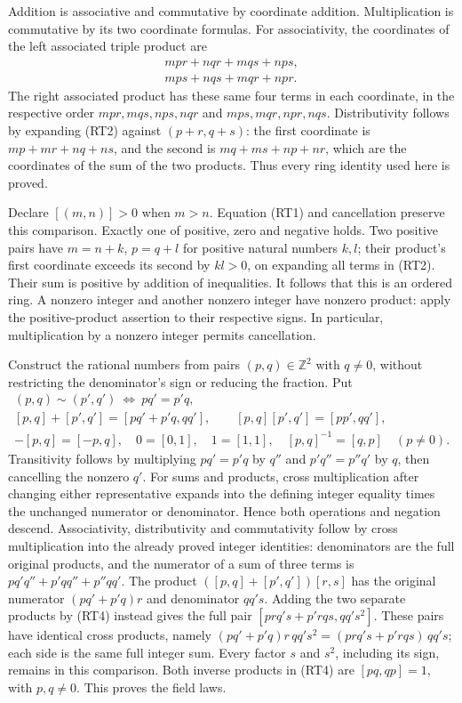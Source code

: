 \documentclass[
  11pt,
]{article}
\begin{document}
Addition is associative and commutative by coordinate addition.
Multiplication is commutative by its two coordinate formulas. For
associativity, the coordinates of the left associated triple product are
\[
\begin{gathered}
mpr+nqr+mqs+nps,\\
mps+nqs+mqr+npr.
\end{gathered}
\tag{RT3}
\] The right associated product has these same four terms in each
coordinate, in the respective order \(mpr,mqs,nps,nqr\) and
\(mps,mqr,npr,nqs\). Distributivity follows by expanding (RT2) against
\((p+r,q+s)\): the first coordinate is \(mp+mr+nq+ns\), and the second
is \(mq+ms+np+nr\), which are the coordinates of the sum of the two
products. Thus every ring identity used here is proved.

Declare \([(m,n)]>0\) when \(m>n\). Equation (RT1) and cancellation
preserve this comparison. Exactly one of positive, zero and negative
holds. Two positive pairs have \(m=n+k\), \(p=q+l\) for positive natural
numbers \(k,l\); their product's first coordinate exceeds its second by
\(kl>0\), on expanding all terms in (RT2). Their sum is positive by
addition of inequalities. It follows that this is an ordered ring. A
nonzero integer and another nonzero integer have nonzero product: apply
the positive-product assertion to their respective signs. In particular,
multiplication by a nonzero integer permits cancellation.

Construct the rational numbers from pairs \((p,q)\in\mathbb Z^2\) with
\(q\ne0\), without restricting the denominator's sign or reducing the
fraction. Put \[
\begin{gathered}
(p,q)\sim(p',q')\ \Longleftrightarrow\ pq'=p'q,\\
[p,q]+[p',q']=[pq'+p'q,qq'],\qquad
[p,q][p',q']=[pp',qq'],\\
-[p,q]=[-p,q],\quad 0=[0,1],\quad 1=[1,1],\quad
[p,q]^{-1}=[q,p]\quad(p\ne0).
\end{gathered}
\tag{RT4}
\] Transitivity follows by multiplying \(pq'=p'q\) by \(q''\) and
\(p'q''=p''q'\) by \(q\), then cancelling the nonzero \(q'\). For sums
and products, cross multiplication after changing either representative
expands into the defining integer equality times the unchanged numerator
or denominator. Hence both operations and negation descend.
Associativity, distributivity and commutativity follow by cross
multiplication into the already proved integer identities: denominators
are the full original products, and the numerator of a sum of three
terms is \(pq'q''+p'qq''+p''qq'\). The product \(([p,q]+[p',q'])[r,s]\)
has the original numerator \((pq'+p'q)r\) and denominator \(qq's\).
Adding the two separate products by (RT4) instead gives the full pair
\([prq's+p'rqs,qq's^2]\). These pairs have identical cross products,
namely \((pq'+p'q)r\,qq's^2=(prq's+p'rqs)\,qq's\); each side is the same
full integer sum. Every factor \(s\) and \(s^2\), including its sign,
remains in this comparison. Both inverse products in (RT4) are
\([pq,qp]=1\), with \(p,q\ne0\). This proves the field laws.
\end{document}
